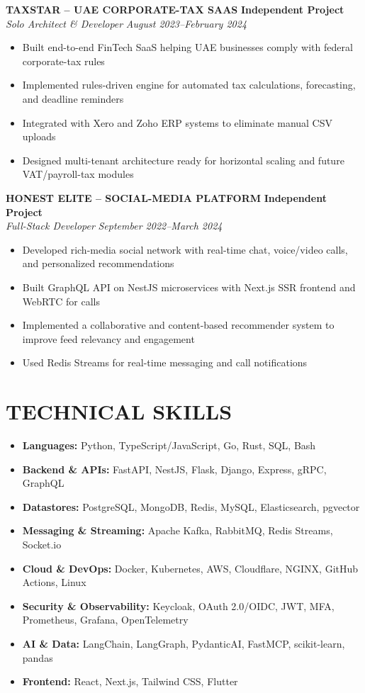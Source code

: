 \documentclass[11pt,letterpaper]{article}
\newcommand{\role}[4]{
  \begin{center}
  \textbf{#1} \hfill \textbf{#2} \\
  \textit{#3} \hfill \textit{#4}
  \end{center}
}
\begin{document}
\role{TAXSTAR -- UAE CORPORATE-TAX SAAS}{Independent Project}{Solo Architect \& Developer}{August 2023--February 2024}
\begin{itemize}[leftmargin=*,nosep,topsep=0pt]
  \item Built end-to-end FinTech SaaS helping UAE businesses comply with federal corporate-tax rules
  \item Implemented rules-driven engine for automated tax calculations, forecasting, and deadline reminders
  \item Integrated with Xero and Zoho ERP systems to eliminate manual CSV uploads
  \item Designed multi-tenant architecture ready for horizontal scaling and future VAT/payroll-tax modules
\end{itemize}

\role{HONEST ELITE -- SOCIAL-MEDIA PLATFORM}{Independent Project}{Full-Stack Developer}{September 2022--March 2024}
\begin{itemize}[leftmargin=*,nosep,topsep=0pt]
  \item Developed rich-media social network with real-time chat, voice/video calls, and personalized recommendations
  \item Built GraphQL API on NestJS microservices with Next.js SSR frontend and WebRTC for calls
  \item Implemented a collaborative and content-based recommender system to improve feed relevancy and engagement
  \item Used Redis Streams for real-time messaging and call notifications
\end{itemize}

\vspace{1em}
\section{TECHNICAL SKILLS}

\vspace{0.5em}
\begin{itemize}[leftmargin=*,nosep]
  \item \textbf{Languages:} Python, TypeScript/JavaScript, Go, Rust, SQL, Bash
  \item \textbf{Backend \& APIs:} FastAPI, NestJS, Flask, Django, Express, gRPC, GraphQL
  \item \textbf{Datastores:} PostgreSQL, MongoDB, Redis, MySQL, Elasticsearch, pgvector
  \item \textbf{Messaging \& Streaming:} Apache Kafka, RabbitMQ, Redis Streams, Socket.io
  \item \textbf{Cloud \& DevOps:} Docker, Kubernetes, AWS, Cloudflare, NGINX, GitHub Actions, Linux
  \item \textbf{Security \& Observability:} Keycloak, OAuth 2.0/OIDC, JWT, MFA, Prometheus, Grafana, OpenTelemetry
  \item \textbf{AI \& Data:} LangChain, LangGraph, PydanticAI, FastMCP, scikit-learn, pandas
  \item \textbf{Frontend:} React, Next.js, Tailwind CSS, Flutter
\end{itemize}
\end{document}

